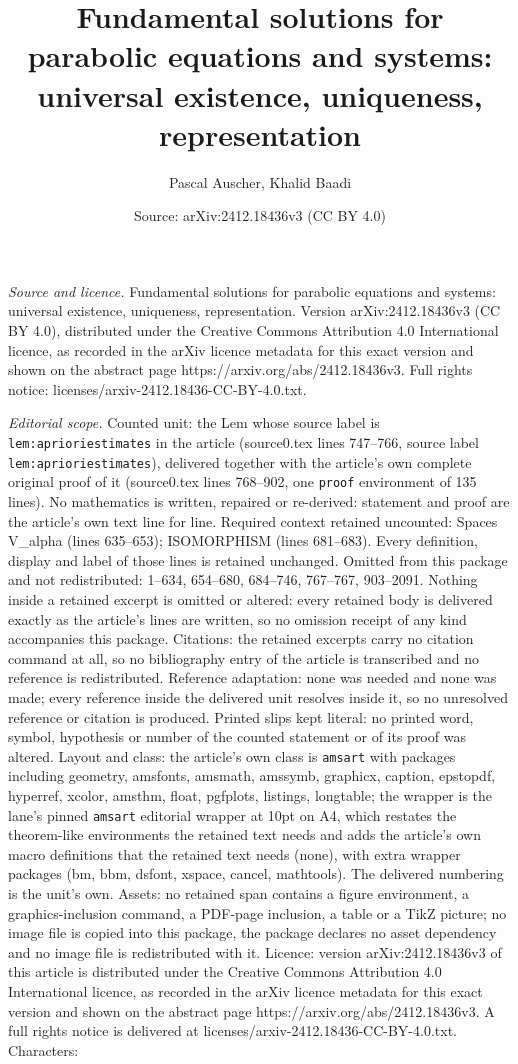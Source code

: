 \documentclass[10pt,a4paper]{amsart}
\title[Fundamental solutions for parabolic equations and systems: u]{Fundamental solutions for parabolic equations and systems: universal existence, uniqueness, representation}
\author{Pascal Auscher, Khalid Baadi}
\date{Source: arXiv:2412.18436v3 (CC BY 4.0)}
\begin{document}
\maketitle

\noindent\emph{Source and licence.} Fundamental solutions for parabolic equations and systems: universal existence, uniqueness, representation. Version arXiv:2412.18436v3 (CC BY 4.0), distributed under the Creative Commons Attribution 4.0 International licence, as recorded in the arXiv licence metadata for this exact version and shown on the abstract page https://arxiv.org/abs/2412.18436v3. Full rights notice: licenses/arxiv-2412.18436-CC-BY-4.0.txt.\par\smallskip

\noindent\textit{Editorial scope.} Counted unit: the Lem whose source label is \texttt{lem:aprioriestimates} in the article (source0.tex lines 747--766, source label \texttt{lem:aprioriestimates}), delivered together with the article's own complete original proof of it (source0.tex lines 768--902, one \texttt{proof} environment of 135 lines). No mathematics is written, repaired or re-derived: statement and proof are the article's own text line for line. Required context retained uncounted: Spaces V\_alpha (lines 635--653); ISOMORPHISM (lines 681--683). Every definition, display and label of those lines is retained unchanged. Omitted from this package and not redistributed: 1--634, 654--680, 684--746, 767--767, 903--2091. Nothing inside a retained excerpt is omitted or altered: every retained body is delivered exactly as the article's lines are written, so no omission receipt of any kind accompanies this package. Citations: the retained excerpts carry no citation command at all, so no bibliography entry of the article is transcribed and no reference is redistributed. Reference adaptation: none was needed and none was made; every reference inside the delivered unit resolves inside it, so no unresolved reference or citation is produced. Printed slips kept literal: no printed word, symbol, hypothesis or number of the counted statement or of its proof was altered. Layout and class: the article's own class is \texttt{amsart} with packages including geometry, amsfonts, amsmath, amssymb, graphicx, caption, epstopdf, hyperref, xcolor, amsthm, float, pgfplots, listings, longtable; the wrapper is the lane's pinned \texttt{amsart} editorial wrapper at 10pt on A4, which restates the theorem-like environments the retained text needs and adds the article's own macro definitions that the retained text needs (none), with extra wrapper packages (bm, bbm, dsfont, xspace, cancel, mathtools). The delivered numbering is the unit's own. Assets: no retained span contains a figure environment, a graphics-inclusion command, a PDF-page inclusion, a table or a TikZ picture; no image file is copied into this package, the package declares no asset dependency and no image file is redistributed with it. Licence: version arXiv:2412.18436v3 of this article is distributed under the Creative Commons Attribution 4.0 International licence, as recorded in the arXiv licence metadata for this exact version and shown on the abstract page https://arxiv.org/abs/2412.18436v3. A full rights notice is delivered at licenses/arxiv-2412.18436-CC-BY-4.0.txt. Characters: 
\end{document}
